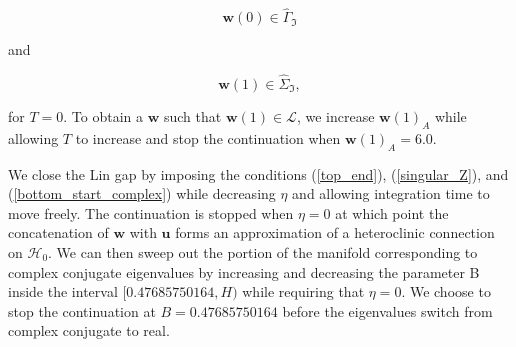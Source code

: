 \documentclass{ws-ijbc}
\begin{document}
\begin{equation}
	\mathbf{w}(0) \in \widehat{\Gamma}_{\Im}
	\label{bottom_start_complex}
\end{equation}

and

\begin{equation}
	\mathbf{w}(1) \in \widehat{\Sigma}_{\Im},
\end{equation}

\noindent
for $T=0$.  To obtain a $\mathbf{w}$ such that $\mathbf{w}(1) \in \mathscr{L}$, we increase $\mathbf{w}(1)_A$ while allowing $T$ to increase and stop the continuation when $\mathbf{w}(1)_A=6.0$.

We close the Lin gap by imposing the conditions (\ref{top_end}), (\ref{singular_Z}), and (\ref{bottom_start_complex}) while decreasing $\eta$ and allowing integration time to move freely.  The continuation is stopped when $\eta=0$ at which point the concatenation of $\mathbf{w}$ with $\mathbf{u}$ forms an approximation of a heteroclinic connection on $\mathscr{H}_0$.  We can then sweep out the portion of the manifold corresponding to complex conjugate eigenvalues by increasing and decreasing the parameter B inside the interval $[0.47685750164, H)$ while requiring that $\eta=0$.  We choose to stop the continuation at $B=0.47685750164$ before the eigenvalues switch from complex conjugate to real.
\end{document}
